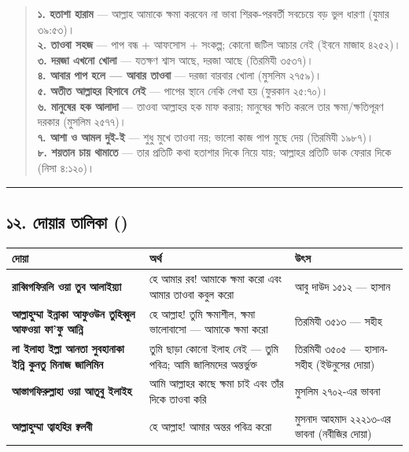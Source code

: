 \begin{quote}
\textbf{১. হতাশা হারাম} — আল্লাহ আমাকে ক্ষমা করবেন না ভাবা শিরক-পরবর্তী সবচেয়ে বড় ভুল ধারণা (যুমার ৩৯:৫৩)। \\
\textbf{২. তাওবা সহজ} — পাপ বন্ধ + আফসোস + সংকল্প; কোনো জটিল আচার নেই (ইবনে মাজাহ ৪২৫২)। \\
\textbf{৩. দরজা এখনো খোলা} — যতক্ষণ শ্বাস আছে, দরজা আছে (তিরমিযী ৩৫৩৭)। \\
\textbf{৪. আবার পাপ হলে — আবার তাওবা} — দরজা বারবার খোলা (মুসলিম ২৭৫৯)। \\
\textbf{৫. অতীত আল্লাহর হিসাবে নেই} — পাপের স্থানে নেকি লেখা হয় (ফুরকান ২৫:৭০)। \\
\textbf{৬. মানুষের হক আলাদা} — তাওবা আল্লাহর হক মাফ করায়; মানুষের ক্ষতি করলে তার ক্ষমা/ক্ষতিপূরণ দরকার (মুসলিম ২৫৭৭)। \\
\textbf{৭. আশা ও আমল দুই-ই} — শুধু মুখে তাওবা নয়; ভালো কাজ পাপ মুছে দেয় (তিরমিযী ১৯৮৭)। \\
\textbf{৮. শয়তান চায় থামাতে} — তার প্রতিটি কথা হতাশার দিকে নিয়ে যায়; আল্লাহর প্রতিটি ডাক ফেরার দিকে (নিসা ৪:১২০)।
\end{quote}

\medskip\hrule\medskip

\subsection*{১২. দোয়ার তালিকা ()}

\begin{table}[h]\centering\small
\begin{tabular}{lll}
দোয়া & অর্থ & উৎস \\
\hline
\textbf{রাব্বিগফিরলি ওয়া তুব আলাইয়্যা} & হে আমার রব! আমাকে ক্ষমা করো এবং আমার তাওবা কবুল করো & আবু দাউদ ১৫১২ — হাসান \\
\textbf{আল্লাহুম্মা ইন্নাকা আফুওউন তুহিব্বুল আফওয়া ফা'ফু আন্নি} & হে আল্লাহ! তুমি ক্ষমাশীল, ক্ষমা ভালোবাসো — আমাকে ক্ষমা করো & তিরমিযী ৩৫১৩ — সহীহ \\
\textbf{লা ইলাহা ইল্লা আনতা সুবহানাকা ইন্নি কুনতু মিনাজ জালিমিন} & তুমি ছাড়া কোনো ইলাহ নেই — তুমি পবিত্র; আমি জালিমদের অন্তর্ভুক্ত & তিরমিযী ৩৫০৫ — হাসান-সহীহ (ইউনুসের দোয়া) \\
\textbf{আস্তাগফিরুল্লাহা ওয়া আতূবু ইলাইহ} & আমি আল্লাহর কাছে ক্ষমা চাই এবং তাঁর দিকে তাওবা করি & মুসলিম ২৭০২-এর ভাবনা \\
\textbf{আল্লাহুম্মা ত্বাহহির ক্বলবী} & হে আল্লাহ! আমার অন্তর পবিত্র করো & মুসনাদ আহমাদ ২২২১৩-এর ভাবনা (নবীজির দোয়া) \\
\hline
\end{tabular}
\end{table}

